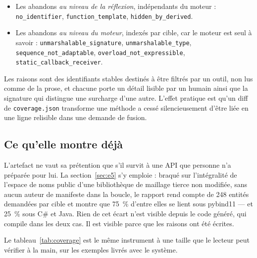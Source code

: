 \documentclass[11pt,a4paper]{article}
\newcommand{\code}[1]{\texttt{\small #1}}
\begin{document}
\begin{itemize}\raggedright\setlength{\itemsep}{2pt}
  \item Les abandons \emph{au niveau de la réflexion}, indépendants du moteur :
    \code{no\_identifier}, \code{function\_template},
    \code{hidden\_by\_derived}.
  \item Les abandons \emph{au niveau du moteur}, indexés par cible, car le moteur
    est seul à savoir : \code{unmarshalable\_signature},
    \code{unmarshalable\_type}, \code{sequence\_not\_adaptable},
    \code{overload\_not\_expressible}, \code{static\_callback\_receiver}.
\end{itemize}

Les raisons sont des identifiants stables destinés à être filtrés par un outil,
non lus comme de la prose, et chacune porte un détail lisible par un humain ainsi
que la signature qui distingue une surcharge d'une autre. L'effet pratique est
qu'un diff de \code{coverage.json} transforme \og une méthode a cessé
silencieusement d'être liée \fg{} en une ligne relisible dans une demande de
fusion.

\subsection{Ce qu'elle montre déjà}

L'artefact ne vaut sa prétention que s'il survit à une API que personne n'a
préparée pour lui. La section~\ref{sec:e5} s'y emploie : braqué sur l'intégralité
de l'espace de noms public d'une bibliothèque de maillage tierce non modifiée,
sans aucun auteur de manifeste dans la boucle, le rapport rend compte de 248
entités demandées par cible et montre que 75~\% d'entre elles se lient sous
pybind11 --- et 25~\% sous C\# et Java. Rien de cet écart n'est visible depuis le
code généré, qui compile dans les deux cas. Il est visible parce que les raisons
ont été écrites.

Le tableau~\ref{tab:coverage} est le même instrument à une taille que le lecteur
peut vérifier à la main, sur les exemples livrés avec le système.
\end{document}

